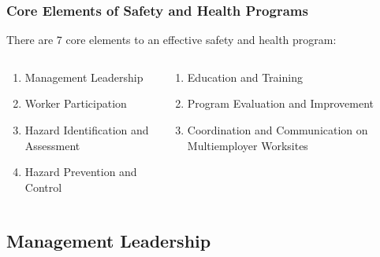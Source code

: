 \begin{frame}
    \frametitle{Core Elements of Safety and Health Programs}

    There are 7 core elements to an effective safety and health program:
    \begin{columns}[t]
        \begin{column}{0.48\linewidth}
            \begin{enumerate}[<+- | alert@+>]
                \item<1->[1.] Management Leadership
                \item<2->[2.] Worker Participation
                \item<3->[3.] Hazard Identification and Assessment
                \item<4->[4.] Hazard Prevention and Control
            \end{enumerate}
        \end{column}
        \begin{column}{0.48\linewidth}
            \begin{enumerate}[<+- | alert@+>]
                \item<5->[5.] Education and Training
                \item<6->[6.] Program Evaluation and Improvement
                \item<7->[7.] Coordination and Communication on Multiemployer Worksites
            \end{enumerate}
        \end{column}
    \end{columns}
\end{frame}

\subsection{Management Leadership}

